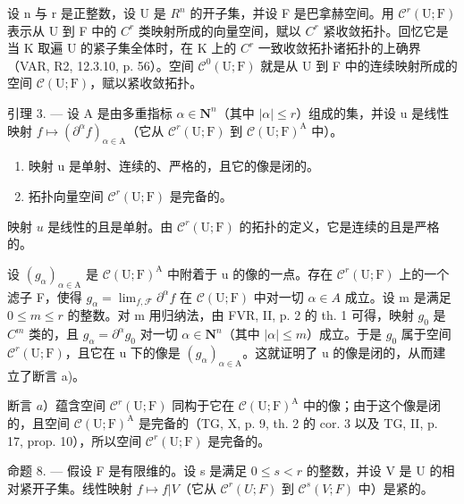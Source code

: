 设 n 与 r 是正整数，设 U 是 \(R^{n}\) 的开子集，并设 F 是巴拿赫空间。用 \(\mathcal{C}^{r}(\mathrm{U};\mathrm{F})\) 表示从 U 到 F 中的 \(C^{r}\) 类映射所成的向量空间，赋以 \(C^{r}\) 紧收敛拓扑。回忆它是当 K 取遍 U 的紧子集全体时，在 K 上的 \(C^{r}\) 一致收敛拓扑诸拓扑的上确界（VAR, R2, 12.3.10, p. 56）。空间 \(\mathcal{C}^{0}(\mathrm{U};\mathrm{F})\) 就是从 U 到 F 中的连续映射所成的空间 \(\mathcal{C}(\mathrm{U};\mathrm{F})\)，赋以紧收敛拓扑。

引理 3. --- 设 A 是由多重指标 \(\alpha \in \mathbf{N}^n\)（其中 \(|\alpha| \leqslant r\)）组成的集，并设 u 是线性映射 \(f \mapsto (\partial^\alpha f)_{\alpha \in \mathrm{A}}\)（它从 \(\mathcal{C}^r(\mathrm{U};\mathrm{F})\) 到 \(\mathcal{C}(\mathrm{U};\mathrm{F})^{\mathrm{A}}\) 中）。

\begin{enumerate}
\def\labelenumi{\alph{enumi})}
\item
  映射 u 是单射、连续的、严格的，且它的像是闭的。
\item
  拓扑向量空间 \(\mathcal{C}^{r}(\mathrm{U};\mathrm{F})\) 是完备的。
\end{enumerate}

映射 \(u\) 是线性的且是单射。由 \(\mathcal{C}^r (\mathrm{U};\mathrm{F})\) 的拓扑的定义，它是连续的且是严格的。

设 \((g_{\alpha})_{\alpha\in\mathrm{A}}\) 是 \(\mathcal{C}(\mathrm{U};\mathrm{F})^{\mathrm{A}}\) 中附着于 u 的像的一点。存在 \(\mathcal{C}^{r}(\mathrm{U};\mathrm{F})\) 上的一个滤子 F，使得 \(g_{\alpha}=\lim_{f,\mathcal{F}}\partial^{\alpha}f\) 在 \(\mathcal{C}(\mathrm{U};\mathrm{F})\) 中对一切 \(\alpha\in A\) 成立。设 m 是满足 \(0\leqslant m\leqslant r\) 的整数。对 m 用归纳法，由 FVR, II, p. 2 的 th. 1 可得，映射 \(g_{0}\) 是 \(C^{m}\) 类的，且 \(g_{\alpha}=\partial^{\alpha}g_{0}\) 对一切 \(\alpha\in\mathbf{N}^{n}\)（其中 \(|\alpha|\leqslant m\)）成立。于是 \(g_{0}\) 属于空间 \(\mathcal{C}^{r}(\mathrm{U};\mathrm{F})\)，且它在 u 下的像是 \((g_{\alpha})_{\alpha\in\mathrm{A}}\)。这就证明了 u 的像是闭的，从而建立了断言 a)。

断言 \(a\)）蕴含空间 \(\mathcal{C}^{r}(\mathrm{U};\mathrm{F})\) 同构于它在 \(\mathcal{C}(\mathrm{U};\mathrm{F})^{\mathrm{A}}\) 中的像；由于这个像是闭的，且空间 \(\mathcal{C}(\mathrm{U};\mathrm{F})^{\mathrm{A}}\) 是完备的（TG, X, p. 9, th. 2 的 cor. 3 以及 TG, II, p. 17, prop. 10），所以空间 \(\mathcal{C}^{r}(\mathrm{U};\mathrm{F})\) 是完备的。

命题 8. --- 假设 F 是有限维的。设 s 是满足 \(0 \leqslant s < r\) 的整数，并设 V 是 U 的相对紧开子集。线性映射 \(f \mapsto f|V\)（它从 \(\mathcal{C}^{r}(U;F)\) 到 \(\mathcal{C}^{s}(V;F)\) 中）是紧的。


